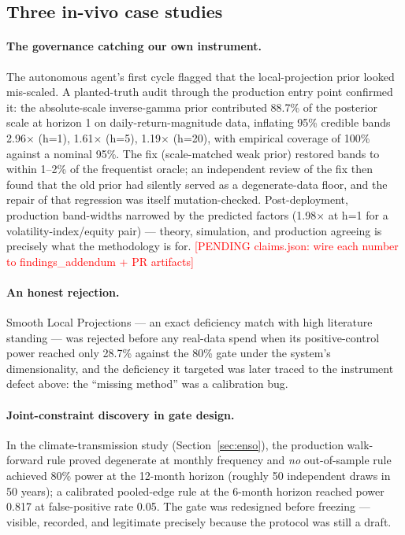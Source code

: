 \documentclass[11pt]{article}
\newcommand{\todoA}[1]{\textcolor{red}{[PENDING #1]}}
\begin{document}
\subsection{Three in-vivo case studies}\label{sec:cases}

\paragraph{The governance catching our own instrument.} The autonomous
agent's first cycle flagged that the local-projection prior looked
mis-scaled. A planted-truth audit through the production entry point
confirmed it: the absolute-scale inverse-gamma prior contributed 88.7\%
of the posterior scale at horizon 1 on daily-return-magnitude data,
inflating 95\% credible bands 2.96$\times$ (h=1), 1.61$\times$ (h=5),
1.19$\times$ (h=20), with empirical coverage of 100\% against a nominal
95\%. The fix (scale-matched weak prior) restored bands to within
1--2\% of the frequentist oracle; an independent review of the fix then
found that the old prior had silently served as a degenerate-data
floor, and the repair of that regression was itself mutation-checked.
Post-deployment, production band-widths narrowed by the predicted
factors (1.98$\times$ at h=1 for a volatility-index/equity pair) ---
theory, simulation, and production agreeing is precisely what the
methodology is for. \todoA{claims.json: wire each number to
findings\_addendum + PR artifacts}

\paragraph{An honest rejection.} Smooth Local Projections --- an exact
deficiency match with high literature standing --- was rejected before
any real-data spend when its positive-control power reached only 28.7\%
against the 80\% gate under the system's dimensionality, and the
deficiency it targeted was later traced to the instrument defect above:
the ``missing method'' was a calibration bug.

\paragraph{Joint-constraint discovery in gate design.} In the
climate-transmission study (Section~\ref{sec:enso}), the production
walk-forward rule proved degenerate at monthly frequency and
\emph{no} out-of-sample rule achieved 80\% power at the 12-month
horizon (roughly 50 independent draws in 50 years); a calibrated
pooled-edge rule at the 6-month horizon reached power 0.817 at
false-positive rate 0.05. The gate was redesigned before freezing ---
visible, recorded, and legitimate precisely because the protocol was
still a draft.
\end{document}
